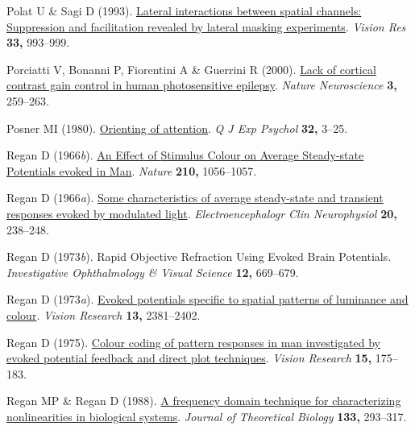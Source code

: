 \documentclass[
  letterpaper,
  DIV=11,
  numbers=noendperiod]{scrartcl}
\newlength{\cslhangindent}
\newenvironment{CSLReferences}[2] %
 {\begin{list}{}{%
  \setlength{\itemindent}{0pt}
  \setlength{\leftmargin}{0pt}
  \setlength{\parsep}{0pt}
  \ifodd #1
   \setlength{\leftmargin}{\cslhangindent}
   \setlength{\itemindent}{-1\cslhangindent}
  \fi
  \setlength{\itemsep}{#2\baselineskip}}}
 {\end{list}}
\begin{document}
\begin{CSLReferences}{1}{1}
Polat U \& Sagi D (1993).
\href{https://doi.org/10.1016/0042-6989(93)90081-7}{Lateral interactions
between spatial channels: Suppression and facilitation revealed by
lateral masking experiments}. \emph{Vision Res} \textbf{33,} 993--999.

Porciatti V, Bonanni P, Fiorentini A \& Guerrini R (2000).
\href{https://doi.org/10.1038/72972}{Lack of cortical contrast gain
control in human photosensitive epilepsy}. \emph{Nature Neuroscience}
\textbf{3,} 259--263.

Posner MI (1980).
\href{https://doi.org/10.1080/00335558008248231}{Orienting of
attention}. \emph{Q J Exp Psychol} \textbf{32,} 3--25.

Regan D (1966\emph{b}). \href{https://doi.org/10.1038/2101056a0}{An
{Effect} of {Stimulus Colour} on {Average Steady-state Potentials}
evoked in {Man}}. \emph{Nature} \textbf{210,} 1056--1057.

Regan D (1966\emph{a}).
\href{https://doi.org/10.1016/0013-4694(66)90088-5}{Some characteristics
of average steady-state and transient responses evoked by modulated
light}. \emph{Electroencephalogr Clin Neurophysiol} \textbf{20,}
238--248.

Regan D (1973\emph{b}). Rapid {Objective Refraction Using Evoked Brain
Potentials}. \emph{Investigative Ophthalmology \& Visual Science}
\textbf{12,} 669--679.

Regan D (1973\emph{a}).
\href{https://doi.org/10.1016/0042-6989(73)90237-X}{Evoked potentials
specific to spatial patterns of luminance and colour}. \emph{Vision
Research} \textbf{13,} 2381--2402.

Regan D (1975).
\href{https://doi.org/10.1016/0042-6989(75)90205-9}{Colour coding of
pattern responses in man investigated by evoked potential feedback and
direct plot techniques}. \emph{Vision Research} \textbf{15,} 175--183.

Regan MP \& Regan D (1988).
\href{https://doi.org/10.1016/S0022-5193(88)80323-0}{A frequency domain
technique for characterizing nonlinearities in biological systems}.
\emph{Journal of Theoretical Biology} \textbf{133,} 293--317.


\end{CSLReferences}
\end{document}
